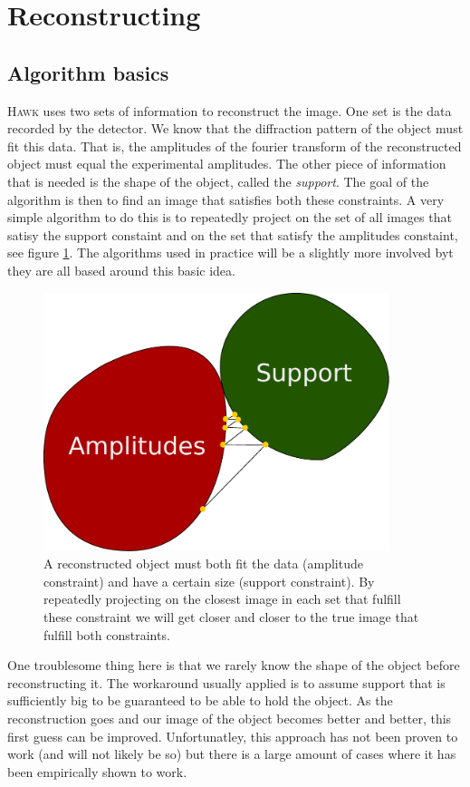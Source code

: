\documentclass[11pt,a4paper]{article}
\newcommand{\hawk}[1]{\textsc{#1}}
\begin{document}
\section{Reconstructing}
\subsection{Algorithm basics}
\hawk{Hawk} uses two sets of information to reconstruct the image. One set is the data recorded by the detector. We know that the diffraction pattern of the object must fit this data. That is, the amplitudes of the fourier transform of the reconstructed object must equal the experimental amplitudes. The other piece of information that is needed is the shape of the object, called the \emph{support}. The goal of the algorithm is then to find an image that satisfies both these constraints. A very simple algorithm to do this is to repeatedly project on the set of all images that satisy the support constaint and on the set that satisfy the amplitudes constaint, see figure \ref{fig:twosets}. The algorithms used in practice will be a slightly more involved byt they are all based around this basic idea.
\begin{figure}
  \includegraphics[width=0.9\textwidth]{Images/Convex_optimization/twosets.pdf}
  \caption{A reconstructed object must both fit the data (amplitude constraint) and have a certain size (support constraint). By repeatedly projecting on the closest image in each set that fulfill these constraint we will get closer and closer to the true image that fulfill both constraints.}
  \label{fig:twosets}
\end{figure}

One troublesome thing here is that we rarely know the shape of the object before reconstructing it. The workaround usually applied is to assume support that is sufficiently big to be guaranteed to be able to hold the object. As the reconstruction goes and our image of the object becomes better and better, this first guess can be improved. Unfortunatley, this approach has not been proven to work (and will not likely be so) but there is a large amount of cases where it has been empirically shown to work.
\end{document}
